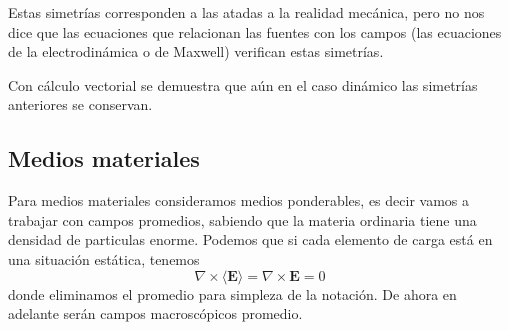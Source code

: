 ﻿\documentclass{article}
\numberwithin{equation}{section} %
\renewcommand{\vec}[1]{\boldsymbol{#1}}
\begin{document}
Estas simetrías corresponden a las atadas a la realidad mecánica, pero no nos dice que las ecuaciones que relacionan las fuentes con los campos (las ecuaciones de la electrodinámica o de Maxwell) verifican estas simetrías. 

Con cálculo vectorial se demuestra que aún en el caso dinámico las simetrías anteriores se conservan.


 \subsection{Medios materiales}
Para medios materiales consideramos medios ponderables, es decir vamos a trabajar con campos promedios, sabiendo que la materia ordinaria tiene una densidad de particulas enorme.
Podemos que si cada elemento de carga está en una situación estática, tenemos
\begin{equation}
\nabla \times \langle \vec{E} \rangle = \nabla \times \vec{E} = 0
\end{equation}
donde eliminamos el promedio para simpleza de la notación. De ahora en adelante serán campos macroscópicos promedio.
\end{document}
